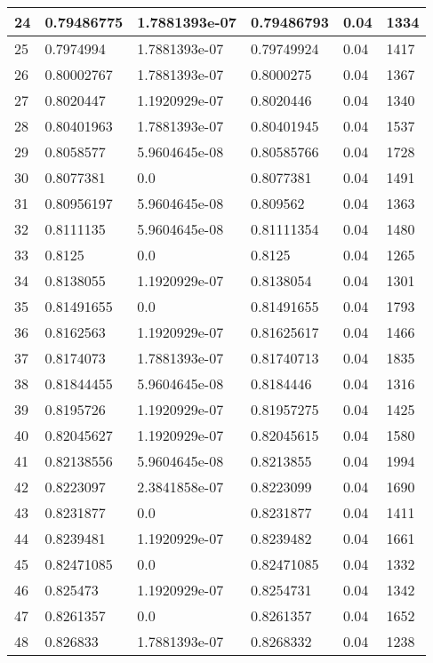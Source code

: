 \begin{longtable}{|l|l|l|l|l|l|}
24 & 0.79486775 & 1.7881393e-07 & 0.79486793 & 0.04 & 1334 \\ \hline 
25 & 0.7974994 & 1.7881393e-07 & 0.79749924 & 0.04 & 1417 \\ \hline 
26 & 0.80002767 & 1.7881393e-07 & 0.8000275 & 0.04 & 1367 \\ \hline 
27 & 0.8020447 & 1.1920929e-07 & 0.8020446 & 0.04 & 1340 \\ \hline 
28 & 0.80401963 & 1.7881393e-07 & 0.80401945 & 0.04 & 1537 \\ \hline 
29 & 0.8058577 & 5.9604645e-08 & 0.80585766 & 0.04 & 1728 \\ \hline 
30 & 0.8077381 & 0.0 & 0.8077381 & 0.04 & 1491 \\ \hline 
31 & 0.80956197 & 5.9604645e-08 & 0.809562 & 0.04 & 1363 \\ \hline 
32 & 0.8111135 & 5.9604645e-08 & 0.81111354 & 0.04 & 1480 \\ \hline 
33 & 0.8125 & 0.0 & 0.8125 & 0.04 & 1265 \\ \hline 
34 & 0.8138055 & 1.1920929e-07 & 0.8138054 & 0.04 & 1301 \\ \hline 
35 & 0.81491655 & 0.0 & 0.81491655 & 0.04 & 1793 \\ \hline 
36 & 0.8162563 & 1.1920929e-07 & 0.81625617 & 0.04 & 1466 \\ \hline 
37 & 0.8174073 & 1.7881393e-07 & 0.81740713 & 0.04 & 1835 \\ \hline 
38 & 0.81844455 & 5.9604645e-08 & 0.8184446 & 0.04 & 1316 \\ \hline 
39 & 0.8195726 & 1.1920929e-07 & 0.81957275 & 0.04 & 1425 \\ \hline 
40 & 0.82045627 & 1.1920929e-07 & 0.82045615 & 0.04 & 1580 \\ \hline 
41 & 0.82138556 & 5.9604645e-08 & 0.8213855 & 0.04 & 1994 \\ \hline 
42 & 0.8223097 & 2.3841858e-07 & 0.8223099 & 0.04 & 1690 \\ \hline 
43 & 0.8231877 & 0.0 & 0.8231877 & 0.04 & 1411 \\ \hline 
44 & 0.8239481 & 1.1920929e-07 & 0.8239482 & 0.04 & 1661 \\ \hline 
45 & 0.82471085 & 0.0 & 0.82471085 & 0.04 & 1332 \\ \hline 
46 & 0.825473 & 1.1920929e-07 & 0.8254731 & 0.04 & 1342 \\ \hline 
47 & 0.8261357 & 0.0 & 0.8261357 & 0.04 & 1652 \\ \hline 
48 & 0.826833 & 1.7881393e-07 & 0.8268332 & 0.04 & 1238 \\ \hline 

\end{longtable}

